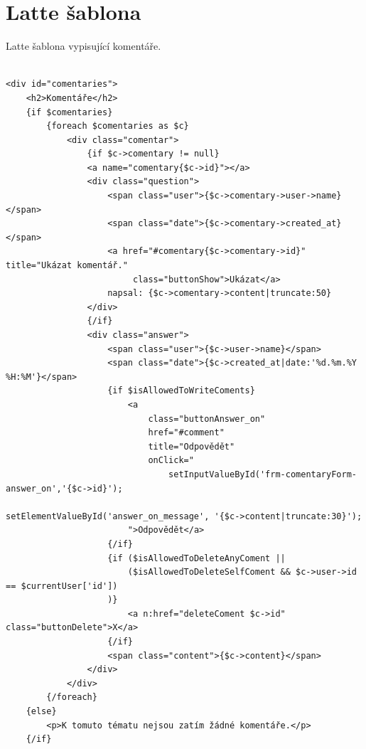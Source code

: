 \documentclass[thesis=B,czech]{FITthesis}[2012/06/26]
\begin{document}
\section{Latte šablona}

Latte šablona vypisující komentáře. 

\begin{tiny}
\begin{verbatim}

<div id="comentaries">
    <h2>Komentáře</h2>
    {if $comentaries}
        {foreach $comentaries as $c}
            <div class="comentar">
                {if $c->comentary != null}
                <a name="comentary{$c->id}"></a>
                <div class="question">
                    <span class="user">{$c->comentary->user->name}</span>
                    <span class="date">{$c->comentary->created_at}</span>
                    <a href="#comentary{$c->comentary->id}" title="Ukázat komentář." 
                         class="buttonShow">Ukázat</a>
                    napsal: {$c->comentary->content|truncate:50}                    
                </div>
                {/if}
                <div class="answer">
                    <span class="user">{$c->user->name}</span>
                    <span class="date">{$c->created_at|date:'%d.%m.%Y %H:%M'}</span>
                    {if $isAllowedToWriteComents}
                        <a
                            class="buttonAnswer_on"
                            href="#comment"
                            title="Odpovědět"
                            onClick="
                                setInputValueById('frm-comentaryForm-answer_on','{$c->id}');
                                setElementValueById('answer_on_message', '{$c->content|truncate:30}');
                        ">Odpovědět</a>
                    {/if}
                    {if ($isAllowedToDeleteAnyComent || 
                        ($isAllowedToDeleteSelfComent && $c->user->id == $currentUser['id'])
                    )}
                        <a n:href="deleteComent $c->id" class="buttonDelete">X</a>
                    {/if}
                    <span class="content">{$c->content}</span>
                </div>
            </div>
        {/foreach}
    {else}
        <p>K tomuto tématu nejsou zatím žádné komentáře.</p>
    {/if}

\end{verbatim}
\end{tiny}
\end{document}
